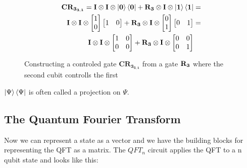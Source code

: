 \begin{figure}[H]
    \begin{align*}
        \mathbf{CR_{3_{3,1}}}=\mathbf{I}\otimes\mathbf{I}\otimes\ket{\mathbf{0}}\bra{\mathbf{0}} + \mathbf{R_{3}}\otimes\mathbf{I}\otimes\ket{\mathbf{1}}\bra{\mathbf{1}}&=\\
        \mathbf{I}\otimes\mathbf{I}\otimes
        \begin{bmatrix}
            1 \\
            0 \\
        \end{bmatrix}
        \begin{bmatrix}
            1 & 0 \\
        \end{bmatrix}+
        \mathbf{R_{3}}\otimes\mathbf{I}\otimes
        \begin{bmatrix}
            0 \\
            1 \\
        \end{bmatrix}
        \begin{bmatrix}
            0 & 1 \\
        \end{bmatrix}
        &=\\
        \mathbf{I}\otimes\mathbf{I}\otimes
        \begin{bmatrix}
            1 & 0 \\
            0 & 0 \\
        \end{bmatrix}+ 
        \mathbf{R_{3}}\otimes\mathbf{I}\otimes
        \begin{bmatrix}
            0 & 0 \\
            0 & 1 \\
        \end{bmatrix}& 
    \end{align*}
    \caption{Constructing a controled gate $\mathbf{CR_{3_{3,1}}}$ from a gate $\mathbf{R_{3}}$ where the second cubit controlls the first}
    \label{fig:CR3}
\end{figure}
\noindent
$\ket{\Psi}\bra{\Psi}$ is often called a projection on $\Psi$. 
\subsection{The Quantum Fourier Transform}\label{sec:qft}
Now we can represent a state as a vector and we have the building blocks for representing the QFT as a matrix. The $QFT_n$ circuit applies the QFT to a n qubit state and looks like this:

